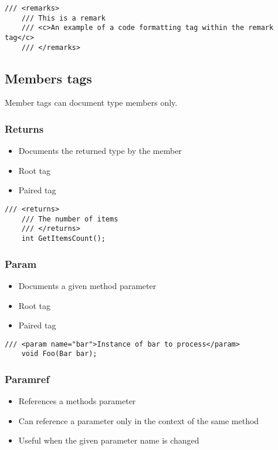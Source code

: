 \begin{lstlisting}[caption=Remark tag]
    /// <remarks>
    /// This is a remark
    /// <c>An example of a code formatting tag within the remark tag</c>
    /// </remarks>
\end{lstlisting}

\subsection{Members tags}

Member tags can document type members only.

\subsubsection*{Returns}
\begin{itemize}
    \item Documents the returned type by the member
    \item Root tag
    \item Paired tag
\end{itemize}

\begin{lstlisting}[caption=Returns tag]
    /// <returns>
    /// The number of items
    /// </returns>
    int GetItemsCount();
\end{lstlisting}

\subsubsection*{Param}
\begin{itemize}
    \item Documents a given method parameter
    \item Root tag
    \item Paired tag
\end{itemize}

\begin{lstlisting}[caption=Param tag]
    /// <param name="bar">Instance of bar to process</param>
    void Foo(Bar bar);
\end{lstlisting}

\subsubsection*{Paramref}
\begin{itemize}
    \item References a methods parameter
    \item Can reference a parameter only in the context of the same method
    \item Useful when the given parameter name is changed
\end{itemize}

